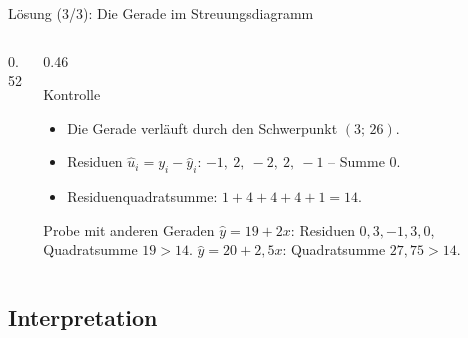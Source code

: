 \documentclass[aspectratio=169,11pt]{beamer}
\def\uebliste{1/21,2/26,3/24,4/30,5/29}
\newcommand{\uebpunkte}{\addplot[only marks, mark=*, mark size=2.6pt, color=hsbiblue]
  coordinates {(1,21) (2,26) (3,24) (4,30) (5,29)};}
\newcommand{\residuenvon}[4]{%
  \foreach \px/\py in #1 {%
    \pgfmathsetmacro{\yh}{#2 + #3*\px}%
    \edef\tmpdraw{\noexpand\draw[#4] (axis cs:\px,\py) -- (axis cs:\px,\yh);}%
    \tmpdraw
  }}
\begin{document}
\begin{frame}{Lösung (3/3): Die Gerade im Streuungsdiagramm}
  \begin{columns}[T]
    \begin{column}{0.52\textwidth}
    \end{column}
    \begin{column}{0.46\textwidth}
      \begin{block}{Kontrolle}
        \begin{itemize}
          \item Die Gerade verläuft durch den Schwerpunkt $(3;\,26)$.
          \item Residuen $\hat{u}_i = y_i - \hat{y}_i$:
                $-1,\ 2,\ -2,\ 2,\ -1$ -- Summe $0$.
          \item Residuenquadratsumme: $1 + 4 + 4 + 4 + 1 = 14$.
        \end{itemize}
      \end{block}
      \begin{exampleblock}{Probe mit anderen Geraden}
        $\hat{y} = 19 + 2x$: Residuen $0, 3, -1, 3, 0$, Quadratsumme $19 > 14$.
        $\hat{y} = 20 + 2{,}5x$: Quadratsumme $27{,}75 > 14$.
      \end{exampleblock}
    \end{column}
  \end{columns}
\end{frame}

\subsection{Interpretation}
\end{document}
